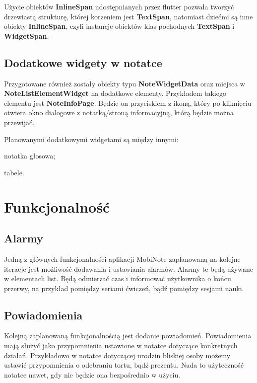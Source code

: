 Użycie obiektów \textbf{InlineSpan} udostępnianych przez flutter pozwala tworzyć drzewiastą strukturę, której korzeniem jest \textbf{TextSpan}, natomiast dziećmi są inne obiekty \textbf{InlineSpan}, czyli instancje obiektów klas pochodnych \textbf{TextSpan} i \textbf{WidgetSpan}.

\subsection{Dodatkowe widgety w notatce}

Przygotowane również zostały obiekty typu \textbf{NoteWidgetData} oraz miejsca w \textbf{NoteListElementWidget} na dodatkowe elementy. Przykładem takiego elementu jest \textbf{NoteInfoPage}. Będzie on przyciskiem z ikoną, który po kliknięciu otwiera okno dialogowe z notatką/stroną informacyjną, którą będzie można przewijać.

Planowanymi dodatkowymi widgetami są między innymi:

\begin{compactitem}
    \item notatka głosowa;
    \item tabele.
\end{compactitem}

\section{Funkcjonalność}

\subsection{Alarmy}

Jedną z głównych funkcjonalności aplikacji MobiNote zaplanowaną na kolejne iteracje jest możliwość dodawania i ustawiania alarmów. Alarmy te będą używane w elementach list. Będą odmierzać czas i informować użytkownika o końcu przerwy, na przykład pomiędzy seriami ćwiczeń, bądź pomiędzy sesjami nauki.

\subsection{Powiadomienia}

Kolejną zaplanowaną funkcjonalnością jest dodanie powiadomień. Powiadomienia mają służyć jako przypomnienia ustawione w notatce dotyczące konkretnych działań. Przykładowo w notatce dotyczącej urodzin bliskiej osoby możemy ustawić przypomnienia o odebraniu tortu, bądź prezentu. Nada to użyteczność notatce nawet, gdy nie będzie ona bezpośrednio w użyciu.

